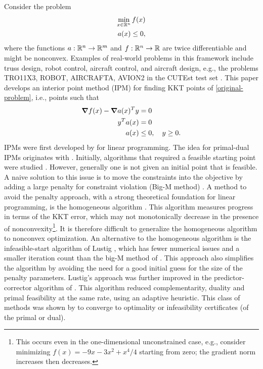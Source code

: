 \documentclass{article}
\begin{document}
Consider the problem
\begin{subequations}\label{original-problem} 
\begin{flalign}
\min_{x \in \mathbb{R}^{n}}{f(x)} \\
a(x) \le 0,
\end{flalign}
\end{subequations}
where the functions $a : \mathbb{R}^{n} \rightarrow \mathbb{R}^{m}$ and $f : \mathbb{R}^{n} \rightarrow \mathbb{R}$ are twice differentiable and might be nonconvex. Examples of real-world problems in this framework include truss design, robot control, aircraft control, and aircraft design, e.g., the problems TRO11X3, ROBOT, AIRCRAFTA, AVION2 in the CUTEst test set \cite{gould2015cutest}. This paper develops an interior point method (IPM) for finding KKT points of \eqref{original-problem}, i.e., points such that
\begin{subequations}\label{kkt-of-original-problem} 
\begin{flalign}
\grad f(x) - \grad a(x)^T y &= 0 \\
y^T a(x) &= 0 \\
a(x) &\le 0, \quad y \ge 0.
\end{flalign}
\end{subequations}
IPMs were first developed by \citet*{karmarkar1984new} for linear programming. The idea for primal-dual IPMs originates with \citet*{megiddo1989pathways}. Initially, algorithms that required a feasible starting point were studied \cite{kojima1989primal,monteiro1989interior}. However, generally one is not given an initial point that is feasible. A naive solution to this issue is to move the constraints into the objective  by adding a large penalty for constraint violation (Big-M method) \cite{mcshane1989implementation}. A method to avoid the penalty approach, with a strong theoretical foundation for linear programming, is the homogeneous algorithm \cite{andersen1998computational,andersen1999homogeneous,ye1994nl}. This algorithm measures progress in terms of the KKT error, which may not monotonically decrease in the presence of nonconvexity\footnote{This occurs even in the one-dimensional unconstrained case, e.g., consider minimizing $f(x)=-9 x - 3 x^2 + x^4/4$ starting from zero; the gradient norm increases then decreases.}. It is therefore difficult to generalize the homogeneous algorithm to nonconvex optimization. An alternative to the homogeneous algorithm is the infeasible-start algorithm of Lustig \cite{lustig1990feasibility}, which has fewer numerical issues and a smaller iteration count than the big-M method of \cite{mcshane1989implementation}. This approach also simplifies the algorithm by avoiding the need for a good initial guess for the size of the penalty parameters. Lustig's approach was further improved in the predictor-corrector algorithm of \citet*{mehrotra1992implementation}. This algorithm reduced complementarity, duality and primal feasibility at the same rate, using an adaptive heuristic. This class of methods was shown by \citet*{todd2003detecting} to converge to optimality or infeasibility certificates (of the primal or dual). 
\end{document}
